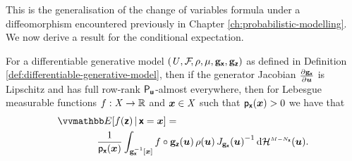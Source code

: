 This is the generalisation of the change of variables formula under a diffeomorphism encountered previously in Chapter \ref{ch:probabilistic-modelling}. We now derive a result for the conditional expectation.
\begin{proposition}
For a differentiable generative model $(\mathit{U},\mathcal{F}\kern-2pt,\rho,\mu,{\mathbf{g}}_{\boldsymbol{\mathsf{x}}},{\mathbf{g}}_{\boldsymbol{\mathsf{z}}})$ as defined in Definition \ref{def:differentiable-generative-model}, then if the generator Jacobian $\frac{\partial {\mathbf{g}}_{\boldsymbol{\mathsf{x}}}}{\partial \boldsymbol{u}}$ is Lipschitz and has full row-rank $\mathsf{P}_{\boldsymbol{\mathsf{u}}}$-almost everywhere, then for Lebesgue measurable functions $f : \mathit{X} \to \mathbb{R}$ and $\boldsymbol{x} \in \mathit{X}$ such that $\mathsf{p}_{\boldsymbol{\mathsf{x}}}(\boldsymbol{x}) > 0$ we have that
\begin{equation}\label{eq:cond-expectation-input-space}
\begin{split}
  &\expc{f(\rvct{z}) \gvn \rvct{x}=\vct{x}}
  =\,\\
  &\qquad\qquad
  \frac{1}{\pden{\rvct{x}}({\vct{x}})}
  \int_{\preimage{\genfunc_{\rvct{x}}}{\vct{x}}}
    f\circ\genfunc_{\rvct{z}}(\vct{u}) \, \rho(\vct{u}) \,
    \jacobproddet{\genfunc_{\rvct{x}}}{\vct{u}}^{-1}
  \,\dr\haum{M-N_{\rvct{x}}}(\vct{u}).
\end{split}
\end{equation}
\end{proposition}

